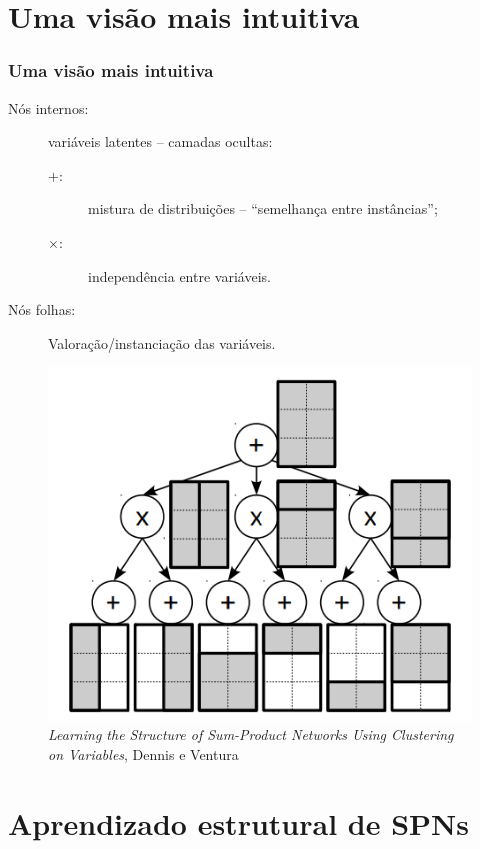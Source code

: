 \documentclass[10pt]{beamer}
\theoremstyle{plain}
\newcommand{\p}{\pause}
\begin{document}
\section[Intuição]{Uma visão mais intuitiva}

\begin{frame}
  \frametitle{Uma visão mais intuitiva}
  \begin{description}
    \item[Nós internos:] variáveis latentes -- camadas ocultas:
    \begin{description}
      \item[$+$:] mistura de distribuições -- ``semelhança entre instâncias'';
      \item[$\times$:] independência entre variáveis.
    \end{description}
    \item[Nós folhas:] Valoração/instanciação das variáveis.
  \end{description}\p
  \begin{figure}[h]
    \centering\includegraphics[scale=0.25]{imgs/img_spn.png}
    \caption{\textit{Learning the Structure of Sum-Product Networks Using Clustering on Variables},
      Dennis e Ventura~\cite{clustering}}
  \end{figure}
\end{frame}


\section{Aprendizado estrutural de SPNs}
\end{document}
